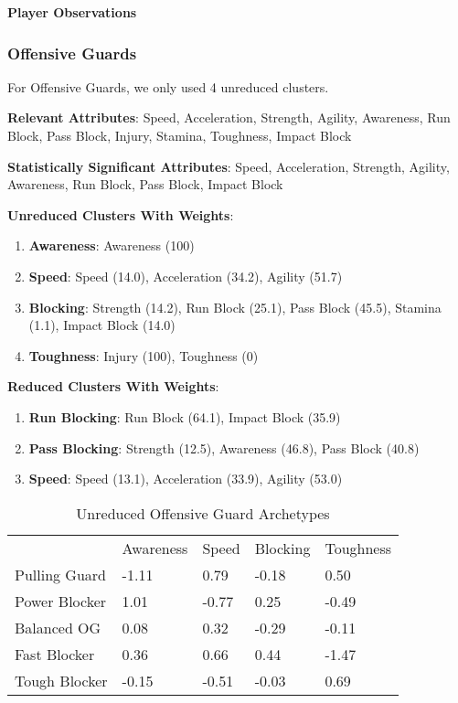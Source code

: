\documentclass[11pt]{article}
\begin{document}
\textbf{Player Observations}


\subsubsection{Offensive Guards}

For Offensive Guards, we only used 4 unreduced clusters.

\textbf{Relevant Attributes}: Speed, Acceleration, Strength, Agility, Awareness, Run Block, Pass Block, Injury, Stamina, Toughness, Impact Block

\textbf{Statistically Significant Attributes}: Speed, Acceleration, Strength, Agility, Awareness, Run Block, Pass Block, Impact Block

\textbf{Unreduced Clusters With Weights}:

\begin{enumerate}
\item{\textbf{Awareness}}: Awareness (100)
\item{\textbf{Speed}}: Speed (14.0), Acceleration (34.2), Agility (51.7)
\item{\textbf{Blocking}}: Strength (14.2), Run Block (25.1), Pass Block (45.5), Stamina (1.1), Impact Block (14.0)
\item{\textbf{Toughness}}: Injury (100), Toughness (0)
\end{enumerate}

\textbf{Reduced Clusters With Weights}:

\begin{enumerate}
\item{\textbf{Run Blocking}}: Run Block (64.1), Impact Block (35.9)
\item{\textbf{Pass Blocking}}: Strength (12.5), Awareness (46.8), Pass Block (40.8)
\item{\textbf{Speed}}: Speed (13.1), Acceleration (33.9), Agility (53.0)
\end{enumerate}

\begin{table}[]
\centering
\caption{Unreduced Offensive Guard Archetypes}
\label{UnreducedOffensiveGuard}
\begin{tabular}{lllll}
              & Awareness & Speed & Blocking & Toughness \\
Pulling Guard & -1.11     & 0.79  & -0.18    & 0.50      \\
Power Blocker & 1.01      & -0.77 & 0.25     & -0.49     \\
Balanced OG   & 0.08      & 0.32  & -0.29    & -0.11     \\
Fast Blocker  & 0.36      & 0.66  & 0.44     & -1.47     \\
Tough Blocker & -0.15     & -0.51 & -0.03    & 0.69     
\end{tabular}
\end{table}
\end{document}
